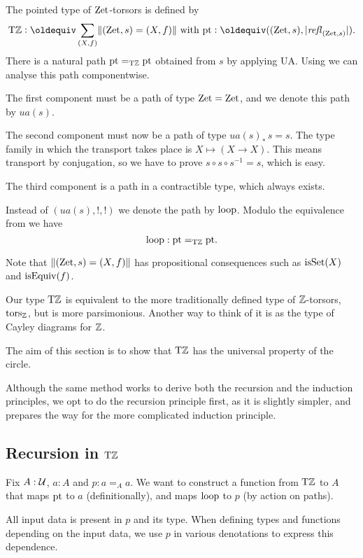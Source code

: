\documentclass[a4,12pt]{amsart}
\begin{document}
\begin{definition}\label{sec:ZTors}
The pointed type of $\mathrm{Zet}$-torsors is defined by
\[
\TorZ\defeq \sum_{(X,f)}\Trunc{(\zet,s)=(X,f)} \text{~with~}
\pt\defeq ((\zet,s),\trunc{\refl{(\zet,s)}}).
\]
There is a natural path ${\mathord{\mathrm{pt}}} =_{\mathrm{T}\mathbb{Z}} {\mathord{\mathrm{pt}}}$ obtained from $s$
by applying UA.
Using \cite[Theorem 2.7.2]{hottbook} we can analyse this path
componentwise. 

The first component must be a path of type $\mathrm{Zet}=\mathrm{Zet}$,
and we denote this path by $ua(s)$. 

The second component must now be
a path of type $ua(s)_*\, s = s$. The type family in which the transport
takes place is $X\mapsto (X\to X)$. This means transport by conjugation,
so we have to prove $s\circ s \circ s^{-1} = s$, which is easy.

The third component is a path in a contractible type, which always exists.

Instead of $(ua(s),!,!)$ we denote the path by $\mathrm{loop}$.
Modulo the equivalence from \cite[Theorem 2.7.2]{hottbook} we have
\[
\mathrm{loop} : {\mathord{\mathrm{pt}}} =_{\mathrm{T}\mathbb{Z}} {\mathord{\mathrm{pt}}}.
\]
\end{definition}
Note that $\lVert(\mathrm{Zet},s)=(X,f)\rVert$ has propositional consequences
such as $\mathrm{isSet}(X)$ and $\mathrm{isEquiv}(f)$.

Our type ${\mathrm{T}\mathbb{Z}}$ is equivalent to the more traditionally defined 
type of $\mathbb{Z}$-torsors, $\mathrm{tors}_{\mathbb{Z}}$, but is more parsimonious.
Another way to think of it is as the type of Cayley diagrams for $\mathbb{Z}$.

The aim of this section is to show that ${\mathrm{T}\mathbb{Z}}$ has the
universal property of the circle.

Although the same method works to derive both the recursion and the induction principles,
we opt to do the recursion principle first,
as it is slightly simpler,
and prepares the way for the more complicated induction principle.


\subsection{Recursion in ${\mathrm{T}\mathbb{Z}}$}\label{sec:TorZ-recursion}

Fix $A:\mathcal{U}$, $a:A$ and $p: a=_A a$.
We want to construct a function from ${\mathrm{T}\mathbb{Z}}$ to $A$ 
that maps ${\mathord{\mathrm{pt}}}$ to $a$ (definitionally),
and maps $\mathrm{loop}$ to $p$ (by action on paths).

All input data is present in $p$ and its type.
When defining types and functions depending on the input data, 
we use $p$ in various denotations to express this dependence. 
\end{document}
